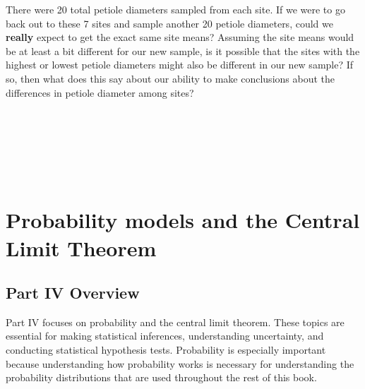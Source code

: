 \documentclass[
  openany]{scrbook}
\begin{document}
There were 20 total petiole diameters sampled from each site.
If we were to go back out to these 7 sites and sample another 20 petiole diameters, could we \textbf{really} expect to get the exact same site means?
Assuming the site means would be at least a bit different for our new sample, is it possible that the sites with the highest or lowest petiole diameters might also be different in our new sample?
If so, then what does this say about our ability to make conclusions about the differences in petiole diameter among sites?

\begin{verbatim}






\end{verbatim}

\hypertarget{part-probability-models-and-the-central-limit-theorem}{%
\part{Probability models and the Central Limit Theorem}\label{part-probability-models-and-the-central-limit-theorem}}

\hypertarget{Week4}{%
\chapter*{Part IV Overview}\label{Week4}}

Part IV focuses on probability and the central limit theorem.
These topics are essential for making statistical inferences, understanding uncertainty, and conducting statistical hypothesis tests.
Probability is especially important because understanding how probability works is necessary for understanding the probability distributions that are used throughout the rest of this book.
\end{document}
